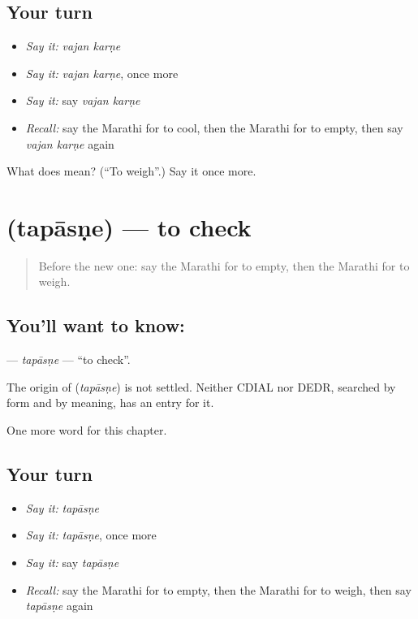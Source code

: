 \subsection*{Your turn}
\begin{itemize}
\raggedright
  \item \emph{Say it:} \emph{vajan karṇe}
  \item \emph{Say it:} \emph{vajan karṇe}, once more
  \item \emph{Say it:} say \emph{vajan karṇe}
  \item \emph{Recall:} say the Marathi for to cool, then the Marathi for to empty, then say \emph{vajan karṇe} again
\end{itemize}

\begin{tcolorbox}[breakable,colback=teal!4,colframe=teal!35!black,title={Before you move on}]
What does   mean? (\textquotedblleft{}To weigh\textquotedblright{}.) Say it once more.
\end{tcolorbox}
\section[\texorpdfstring{\mr{तपासणे} (tapāsṇe)}{तपासणे (tapāsṇe)}]{ (tapāsṇe) — to check}

\label{lesson:MR-C163-tapasne}



\begin{quote}
Before the new one: say the Marathi for to empty, then the Marathi for to weigh.
\end{quote}

\subsection*{You'll want to know: }
\textbf{} — \emph{tapāsṇe} — \textquotedblleft{}to check\textquotedblright{}.

\begin{cousinweb}
The origin of \textbf{} (\emph{tapāsṇe}) is not settled. Neither CDIAL nor DEDR, searched by form and by meaning, has an entry for it.
\end{cousinweb}

\begin{grammarlens}[title={What you've built}]
One more word for this chapter.
\end{grammarlens}

\subsection*{Your turn}
\begin{itemize}
\raggedright
  \item \emph{Say it:} \emph{tapāsṇe}
  \item \emph{Say it:} \emph{tapāsṇe}, once more
  \item \emph{Say it:} say \emph{tapāsṇe}
  \item \emph{Recall:} say the Marathi for to empty, then the Marathi for to weigh, then say \emph{tapāsṇe} again
\end{itemize}

